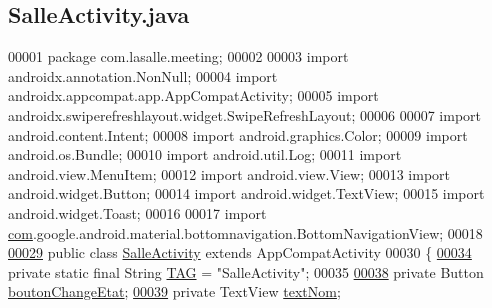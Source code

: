 \hypertarget{_salle_activity_8java_source}{}\subsection{Salle\+Activity.\+java}
\label{_salle_activity_8java_source}

\begin{DoxyCode}
00001 \textcolor{keyword}{package }com.lasalle.meeting;
00002 
00003 \textcolor{keyword}{import} androidx.annotation.NonNull;
00004 \textcolor{keyword}{import} androidx.appcompat.app.AppCompatActivity;
00005 \textcolor{keyword}{import} androidx.swiperefreshlayout.widget.SwipeRefreshLayout;
00006 
00007 \textcolor{keyword}{import} android.content.Intent;
00008 \textcolor{keyword}{import} android.graphics.Color;
00009 \textcolor{keyword}{import} android.os.Bundle;
00010 \textcolor{keyword}{import} android.util.Log;
00011 \textcolor{keyword}{import} android.view.MenuItem;
00012 \textcolor{keyword}{import} android.view.View;
00013 \textcolor{keyword}{import} android.widget.Button;
00014 \textcolor{keyword}{import} android.widget.TextView;
00015 \textcolor{keyword}{import} android.widget.Toast;
00016 
00017 \textcolor{keyword}{import} \hyperlink{namespacecom}{com}.google.android.material.bottomnavigation.BottomNavigationView;
00018 
\hyperlink{classcom_1_1lasalle_1_1meeting_1_1_salle_activity}{00029} \textcolor{keyword}{public} \textcolor{keyword}{class }\hyperlink{classcom_1_1lasalle_1_1meeting_1_1_salle_activity}{SalleActivity} \textcolor{keyword}{extends} AppCompatActivity
00030 \{
\hyperlink{classcom_1_1lasalle_1_1meeting_1_1_salle_activity_a70adba176c2984edf5ae1b188017ac25}{00034}     \textcolor{keyword}{private} \textcolor{keyword}{static} \textcolor{keyword}{final} String \hyperlink{classcom_1_1lasalle_1_1meeting_1_1_salle_activity_a70adba176c2984edf5ae1b188017ac25}{TAG} = \textcolor{stringliteral}{"SalleActivity"};      
00035 
\hyperlink{classcom_1_1lasalle_1_1meeting_1_1_salle_activity_a0c33eac55429431e84849eca22ad3916}{00038}     \textcolor{keyword}{private} Button \hyperlink{classcom_1_1lasalle_1_1meeting_1_1_salle_activity_a0c33eac55429431e84849eca22ad3916}{boutonChangeEtat};                        
\hyperlink{classcom_1_1lasalle_1_1meeting_1_1_salle_activity_acb7acab3be7f76509ac3de29e715e008}{00039}     \textcolor{keyword}{private} TextView \hyperlink{classcom_1_1lasalle_1_1meeting_1_1_salle_activity_acb7acab3be7f76509ac3de29e715e008}{textNom};                               

\end{DoxyCode}
